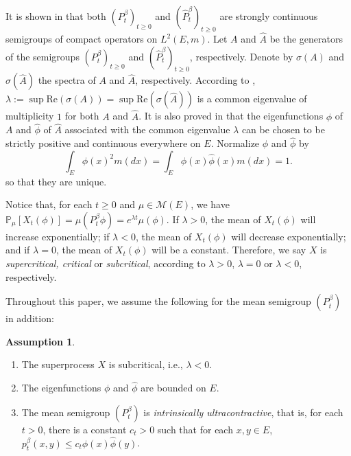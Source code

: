 \documentclass[12pt,a4paper]{amsart}
\theoremstyle{plain}
\theoremstyle{definition}
\newtheorem{asp}{Assumption}
\numberwithin{equation}{section}
\begin{document}
It is shown in \cite{RenSongZhang2015Limit, RenSongZhang2017Central} that both
$(P^\beta_t)_{t \geq 0}$ and $(\widehat P_t^{\beta})_{t\geq 0}$ are strongly
continuous semigroups of compact operators on $L^2(E,m)$. Let $A$ and $\widehat
A$ be the generators of the semigroups $(P^\beta_t)_{t \geq 0}$ and $(\widehat
P^\beta_t)_{t \geq 0}$, respectively. Denote by $\sigma(A)$ and $\sigma(\widehat
A)$ the spectra of $A$ and $\widehat A$, respectively. According to
\cite[Theorem V.6.6]{Schaefer1974Banach}, $\lambda := \sup \text{Re}(\sigma(A))
= \sup \text{Re}(\sigma(\widehat A))$ is a common eigenvalue of multiplicity $1$
for both $A$ and $\widehat A$. It is also proved in
\cite{RenSongZhang2015Limit,RenSongZhang2017Central} that the eigenfunctions
$\phi$ of $A$ and $\hat\phi$ of $\widehat A$ associated with the common
eigenvalue $\lambda$ can be chosen to be strictly positive and continuous
everywhere on $E$. Normalize $\phi$ and $\hat\phi$ by
\[	
	\int_E \phi(x)^2 m(dx) = \int_E \phi(x) \hat \phi(x) m(dx) = 1.
\]
so that they are unique.

Notice that, for each $t \geq 0$ and $\mu \in \mathcal M(E)$, we have $ \mathbb
P_\mu[X_t(\phi)] = \mu(P^\beta_t \phi) = e^{\lambda t} \mu(\phi). $ If $\lambda
> 0$, the mean of $X_t(\phi)$ will increase exponentially; if $\lambda < 0$, the
mean of $X_t(\phi)$ will decrease exponentially; and if $\lambda = 0$, the mean
of $X_t(\phi)$ will be a constant. Therefore, we say $X$ is \emph{supercritical,
  critical} or \emph{subcritical}, according to $\lambda > 0$, $\lambda = 0$ or
$\lambda < 0$, respectively.

Throughout this paper, we assume the following for the mean semigroup
$(P_t^\beta)$ in addition:
\begin{asp}
\label{asp:IU}
\begin{enumerate}
\item The superprocess $X$ is subcritical, i.e., $\lambda < 0$.
\item The eigenfunctions $\phi$ and $\hat\phi$ are bounded on $E$.
\item The mean semigroup $(P_t^\beta)$ is \emph{intrinsically ultracontractive},
  that is, for each $t>0$, there is a constant $c_t >0$ such that for each
  $x,y\in E$, $p^\beta_t(x,y) \leq c_t \phi(x) \hat\phi(y)$.
\end{enumerate}
\end{asp}
\end{document}
